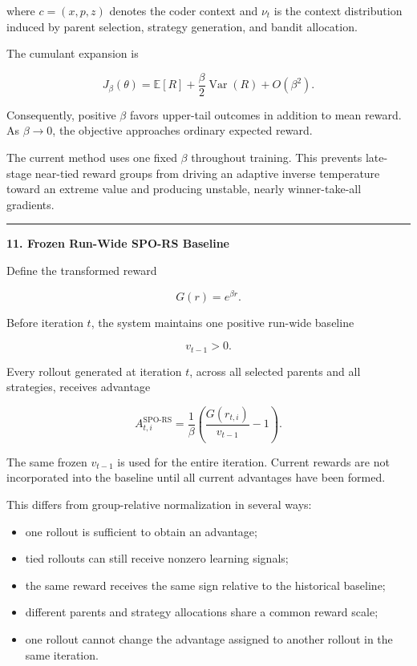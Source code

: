 \documentclass[
]{article}
\providecommand{\tightlist}{%
  \setlength{\itemsep}{0pt}\setlength{\parskip}{0pt}}
\begin{document}
where \(c=(x,p,z)\) denotes the coder context and \(\nu_t\) is the
context distribution induced by parent selection, strategy generation,
and bandit allocation.

The cumulant expansion is

\[
J_\beta(\theta)
=
\mathbb{E}[R]
+
\frac{\beta}{2}\operatorname{Var}(R)
+
O(\beta^2).
\]

Consequently, positive \(\beta\) favors upper-tail outcomes in addition
to mean reward. As \(\beta\to 0\), the objective approaches ordinary
expected reward.

The current method uses one fixed \(\beta\) throughout training. This
prevents late-stage near-tied reward groups from driving an adaptive
inverse temperature toward an extreme value and producing unstable,
nearly winner-take-all gradients.

\begin{center}\rule{0.5\linewidth}{0.5pt}\end{center}

\textbf{11. Frozen Run-Wide SPO-RS Baseline}

Define the transformed reward

\[
G(r)=e^{\beta r}.
\]

Before iteration \(t\), the system maintains one positive run-wide
baseline

\[
v_{t-1}>0.
\]

Every rollout generated at iteration \(t\), across all selected parents
and all strategies, receives advantage

\[
A_{t,i}^{\mathrm{SPO\text{-}RS}}
=
\frac{1}{\beta}
\left(
\frac{G(r_{t,i})}{v_{t-1}}-1
\right).
\]

The same frozen \(v_{t-1}\) is used for the entire iteration. Current
rewards are not incorporated into the baseline until all current
advantages have been formed.

This differs from group-relative normalization in several ways:

\begin{itemize}
\tightlist
\item
  one rollout is sufficient to obtain an advantage;
\item
  tied rollouts can still receive nonzero learning signals;
\item
  the same reward receives the same sign relative to the historical
  baseline;
\item
  different parents and strategy allocations share a common reward
  scale;
\item
  one rollout cannot change the advantage assigned to another rollout in
  the same iteration.
\end{itemize}
\end{document}
